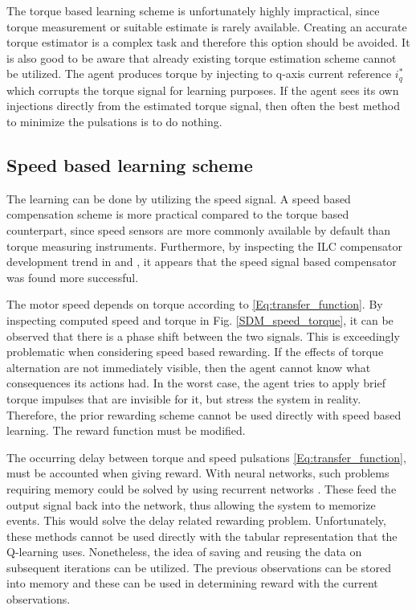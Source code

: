 The torque based learning scheme is unfortunately highly impractical, since torque measurement or suitable estimate is rarely available. Creating an accurate torque estimator is a complex task and therefore this option should be avoided. It is also good to be aware that already existing torque estimation scheme cannot be utilized. The agent produces torque by injecting to q-axis current reference $i^*_q$ which corrupts the torque signal for learning purposes. If the agent sees its own injections directly from the estimated torque signal, then often the best method to minimize the pulsations is to do nothing.


\subsection{Speed based learning scheme}
The learning can be done by utilizing the speed signal. A speed based compensation scheme is more practical compared to the torque based counterpart, since speed sensors are more commonly available by default than torque measuring instruments. Furthermore, by inspecting the ILC compensator development trend in \cite{ILC:2004} and \cite{ILC:2005}, it appears that the speed signal based compensator was found more successful.

The motor speed depends on torque according to \eqref{Eq:transfer_function}. By inspecting computed speed and torque in Fig. \ref{SDM_speed_torque}, it can be observed that there is a phase shift between the two signals. This is exceedingly problematic when considering speed based rewarding. If the effects of torque alternation are not immediately visible, then the agent cannot know what consequences its actions had. In the worst case, the agent tries to apply brief torque impulses that are invisible for it, but stress the system in reality. Therefore, the prior rewarding scheme cannot be used directly with speed based learning. The reward function must be modified.

The occurring delay between torque and speed pulsations \eqref{Eq:transfer_function}, must be accounted when giving reward. With neural networks, such problems requiring memory could be solved by using recurrent networks \cite{RL:memory}. These feed the output signal back into the network, thus allowing the system to memorize events. This would solve the delay related rewarding problem. Unfortunately, these methods cannot be used directly with the tabular representation that the Q-learning uses. Nonetheless, the idea of saving and reusing the data on subsequent iterations can be utilized. The previous observations can be stored into memory and these can be used in determining reward with the current observations. 

